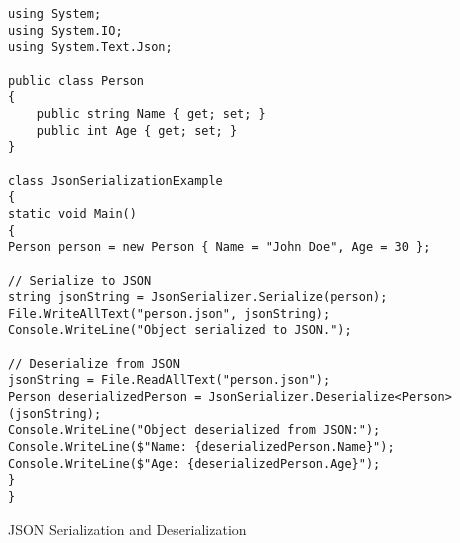 \begin{listing}[htbp]
\begin{verbatim}
using System;
using System.IO;
using System.Text.Json;

public class Person
{
    public string Name { get; set; }
    public int Age { get; set; }
}

class JsonSerializationExample
{
static void Main()
{
Person person = new Person { Name = "John Doe", Age = 30 };

// Serialize to JSON
string jsonString = JsonSerializer.Serialize(person);
File.WriteAllText("person.json", jsonString);
Console.WriteLine("Object serialized to JSON.");

// Deserialize from JSON
jsonString = File.ReadAllText("person.json");
Person deserializedPerson = JsonSerializer.Deserialize<Person>(jsonString);
Console.WriteLine("Object deserialized from JSON:");
Console.WriteLine($"Name: {deserializedPerson.Name}");
Console.WriteLine($"Age: {deserializedPerson.Age}");
}
}
\end{verbatim}
\caption{JSON Serialization and Deserialization} 
\label{JSONSerialization}
\end{listing}